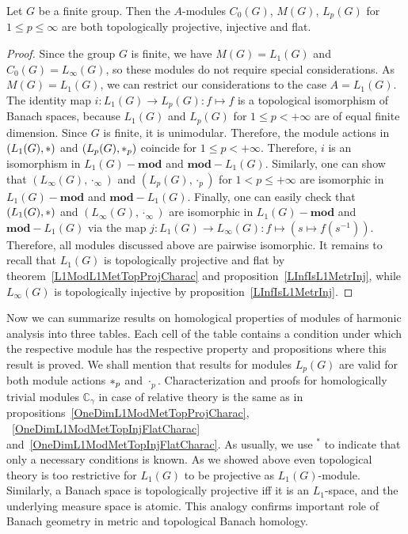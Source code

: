 \begin{proposition}\label{StdModFinGrL1MGTopInjProjFlatCharac} Let $G$ be a
finite group. Then the $A$-modules $C_0(G)$, $M(G)$, $L_p(G)$ 
for $1\leq p\leq \infty$ are both topologically projective, injective and flat.
\end{proposition} 
\begin{proof}
Since the group $G$ is finite, we have $M(G)=L_1(G)$ and $C_0(G)=L_\infty(G)$, 
so these modules do not require special considerations. As $M(G)=L_1(G)$, 
we can restrict our considerations to the case $A=L_1(G)$. The identity map
$i:L_1(G)\to L_p(G):f\mapsto f$ is a topological isomorphism of Banach spaces,
because $L_1(G)$ and $L_p(G)$ for $1\leq p<+\infty$ are of equal finite
dimension. Since $G$ is finite, it is unimodular. Therefore, the module actions
in $(L_1(G),\ast)$ and $(L_p(G),\ast_p)$ coincide for $1\leq p<+\infty$.
Therefore, $i$ is an isomorphism in $L_1(G)-\mathbf{mod}$ and $\mathbf{mod}-L_1(G)$.
Similarly, one can show that $(L_\infty(G),\cdot_\infty)$ and $(L_p(G),\cdot_p)$
for $1<p\leq+\infty$ are isomorphic in $L_1(G)-\mathbf{mod}$ and
$\mathbf{mod}-L_1(G)$. Finally, one can easily check that $(L_1(G),\ast)$ and
$(L_\infty(G),\cdot_\infty)$ are isomorphic in $L_1(G)-\mathbf{mod}$ and
$\mathbf{mod}-L_1(G)$ via the 
map $j:L_1(G)\to L_\infty(G):f\mapsto(s\mapsto f(s^{-1}))$. Therefore, all 
modules discussed above are pairwise isomorphic. It remains to
recall that $L_1(G)$ is topologically projective and flat by
theorem~\ref{L1ModL1MetTopProjCharac} and proposition~\ref{LInfIsL1MetrInj},
while $L_\infty(G)$ is topologically injective by
proposition~\ref{LInfIsL1MetrInj}.
\end{proof}

Now we can summarize results on homological properties of modules of harmonic
analysis into three tables. Each cell of the table contains a condition under
which the respective module has the respective property and propositions where this
result is proved. We shall mention that results for modules $L_p(G)$ are valid for both
module actions $\ast_p$ and $\cdot_p$. Characterization and proofs for
homologically trivial modules $\mathbb{C}_\gamma$ in case of relative theory is
the same as in
propositions~\ref{OneDimL1ModMetTopProjCharac},
~\ref{OneDimL1ModMetTopInjFlatCharac}
and~\ref{OneDimL1ModMetTopInjFlatCharac}. As usually, we use ${}^{*}$ to
indicate that only a necessary conditions is known. As we showed above even
topological theory is too restrictive for $L_1(G)$ to be projective as
$L_1(G)$-module. Similarly, a Banach space is topologically projective iff it is
an $L_1$-space, and the underlying measure space is atomic. This analogy
confirms important role of Banach geometry in metric and topological Banach
homology.

